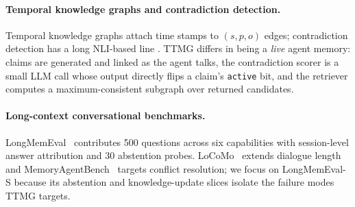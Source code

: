 \paragraph{Temporal knowledge graphs and contradiction detection.}
Temporal knowledge graphs \citep{tkg_survey,tkgqa} attach time stamps
to $(s, p, o)$ edges; contradiction detection has a long NLI-based
line \citep{nli_contradict,anli}. TTMG differs in being a \emph{live}
agent memory: claims are generated and linked as the agent talks,
the contradiction scorer is a small LLM call whose output directly
flips a claim's \texttt{active} bit, and the retriever computes a
maximum-consistent subgraph over returned candidates.

\paragraph{Long-context conversational benchmarks.}
LongMemEval~\citep{longmemeval} contributes 500 questions across six
capabilities with session-level answer attribution and 30 abstention
probes. LoCoMo~\citep{locomo} extends dialogue length and
MemoryAgentBench~\citep{memoryagentbench} targets conflict
resolution; we focus on LongMemEval-S because its abstention and
knowledge-update slices isolate the failure modes TTMG targets.
